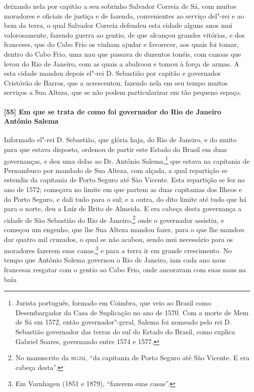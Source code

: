 \begin{linenumbers}
deixando nela por capitão a seu sobrinho Salvador Correia de Sá, com muitos moradores e
oficiais de justiça e de fazenda, convenientes ao serviço del"-rei e ao bem da terra, o
qual Salvador Correia defendeu esta cidade alguns anos mui valorosamente, fazendo guerra
ao gentio, de que alcançou grandes vitórias, e dos franceses, que do Cabo Frio os vinham
ajudar e favorecer, aos quais foi tomar, dentro do Cabo Frio, uma nau que passava de
duzentos tonéis, com canoas que levou do Rio de Janeiro, com as quais a abalroou e tomou à
força de armas. A esta cidade mandou depois el"-rei D. Sebastião por capitão e governador
Cristóvão de Barros, que a acrescentou, fazendo nela em seu tempo muitos serviços a Sua
Alteza, que se não podem particularizar em tão pequeno espaço.

\paragraph{[55] Em que se trata de como foi governador do Rio de Janeiro Antônio Salema} \quad
Informado el"-rei D. Sebastião, que glória haja, do Rio de Janeiro, e do muito para que
estava disposto, ordenou de partir este Estado do Brasil em duas governanças, e deu uma
delas ao Dr. Antônio Salema,\footnote{ Jurista português, formado em Coimbra, que veio ao
Brasil como Desembargador da Casa de Suplicação no ano de 1570. Com a morte de Mem de Sá
em 1572, então governador"-geral, Salema foi nomeado pelo rei D. Sebastião governador das
terras do sul do Estado do Brasil, como explica Gabriel Soares, governando entre 1574 e
1577.} que estava na capitania de Pernambuco por mandado de Sua Alteza, com alçada, a
qual repartição se estendia da capitania de Porto Seguro até São Vicente. Esta repartição
se fez no ano de 1572; começava no limite em que partem as duas capitanias dos Ilheos e do
Porto Seguro, e dali tudo para o sul; e a outra, do dito limite até tudo que há para o
norte, deu a Luíz de Brito de Almeida. E era cabeça desta governança a cidade de São
Sebastião do Rio de Janeiro,\footnote{ No manuscrito da \textsc{bgjm}, ``da capitania de
Porto Seguro até São Vicente. E era cabeça desta''.} onde o governador assistiu, e começou
um engenho, que lhe Sua Alteza mandou fazer, para o que lhe mandou dar quatro mil
cruzados, o qual se não acabou, sendo mui necessário para os moradores fazerem suas
canas,\footnote{ Em Varnhagen (1851 e 1879), ``fazerem suas casas''.} e para a terra ir em
grande crescimento. No tempo que Antônio Salema governou o Rio de Janeiro, iam cada ano
naus francesas resgatar com o gentio ao Cabo Frio, onde ancoravam com suas naus na baía

\end{linenumbers}
